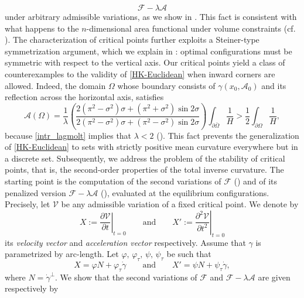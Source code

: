 \documentclass[11pt]{amsart}
\newcommand{\A}{\mathcal A}
\newcommand{\F}{\mathcal F}
\newcommand{\ptl}{\partial}
\newcommand{\Om}{\Omega}
\newcommand{\ga}{\gamma}
\theoremstyle{definition}
\theoremstyle{remark}
\numberwithin{equation}{section}
\begin{document}
	\begin{equation*}
		\F-\lambda\A
	\end{equation*}
	under arbitrary admissible variations, as we show in . This fact is consistent with what happens to the $n$-dimensional area functional under volume constraints (cf. \cite{MR731682}). The characterization of critical points further exploits a Steiner-type symmetrization argument, which we explain in : optimal configurations must be symmetric with respect to the vertical axis. Our critical points yield a class of counterexamples to the validity of \eqref{HK-Euclidean} when inward corners are allowed. Indeed, the domain $\Om$ whose boundary consists of $\gamma(x_0,\A_0)$ and its reflection across the horizontal axis, satisfies
	\begin{equation*}
		\A(\Om)= \frac{1}{\lambda}\left(\frac{2(\pi^2-\sigma^2)\sigma+(\pi^2+\sigma^2)\sin 2\sigma}{2(\pi^2-\sigma^2)\sigma+(\pi^2-\sigma^2)\sin 2\sigma}\right)\int_{\ptl\bar\Om}\frac{1}{H}>\frac{1}{2}\int_{\ptl\Om}\frac{1}{H},
	\end{equation*}
	because \eqref{intr_lagmolt} implies that $\lambda<2$ (). This fact prevents the generalization of \eqref{HK-Euclidean} to sets with strictly positive mean curvature everywhere but in a discrete set. 
	Subsequently, we address the problem of the stability of critical points, that is, the second-order properties of the total inverse curvature. The starting point is the computation of the second variations of $\F$ () and of its penalized version $\F-\lambda\A$ (), evaluated at the equilibrium configurations. Precisely, let $\mathcal V$ be any admissible variation of a fixed critical point. We denote by 
	\begin{equation*}
		X:=\left.\frac{\partial \mathcal V}{\partial t}\right|_{t=0}\qquad\text{and}  \qquad X':=\left.\frac{\partial^2 \mathcal V}{\partial t^2}\right|_{t=0}
	\end{equation*}
	its \emph{velocity vector} and \emph{acceleration vector} respectively. Assume that $\gamma$ is parametrized by arc-length. Let $\varphi,\,\varphi_\tau,\,\psi,\,\psi_\tau$ be such that 
	\begin{equation}\label{intro_quattrofunzioni}
		X=\varphi N+\varphi_\tau\dot\gamma\qquad\text{and}\qquad X'=\psi N+\psi_\tau\dot\gamma,
	\end{equation}
	where $N=\dot \ga^\perp$.  We show that the second variations of $\F$ and $\F-\lambda\A$ are given respectively by
\end{document}

